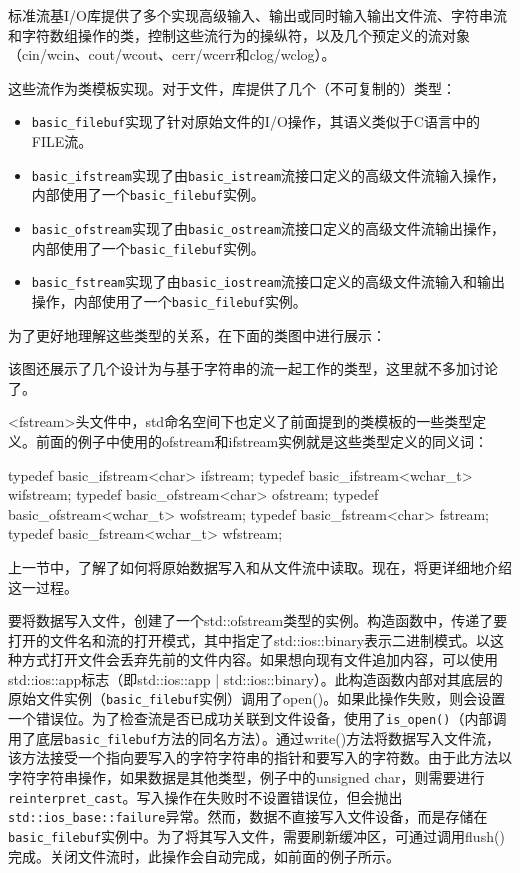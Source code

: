 
标准流基I/O库提供了多个实现高级输入、输出或同时输入输出文件流、字符串流和字符数组操作的类，控制这些流行为的操纵符，以及几个预定义的流对象（cin/wcin、cout/wcout、cerr/wcerr和clog/wclog）。

这些流作为类模板实现。对于文件，库提供了几个（不可复制的）类型：

\begin{itemize}
\item
\verb|basic_filebuf|实现了针对原始文件的I/O操作，其语义类似于C语言中的FILE流。

\item
\verb|basic_ifstream|实现了由\verb|basic_istream|流接口定义的高级文件流输入操作，内部使用了一个\verb|basic_filebuf|实例。

\item
\verb|basic_ofstream|实现了由\verb|basic_ostream|流接口定义的高级文件流输出操作，内部使用了一个\verb|basic_filebuf|实例。

\item
\verb|basic_fstream|实现了由\verb|basic_iostream|流接口定义的高级文件流输入和输出操作，内部使用了一个\verb|basic_filebuf|实例。
\end{itemize}

为了更好地理解这些类型的关系，在下面的类图中进行展示：


该图还展示了几个设计为与基于字符串的流一起工作的类型，这里就不多加讨论了。

<fstream>头文件中，std命名空间下也定义了前面提到的类模板的一些类型定义。前面的例子中使用的ofstream和ifstream实例就是这些类型定义的同义词：

\begin{cpp}
typedef basic_ifstream<char>    ifstream;
typedef basic_ifstream<wchar_t> wifstream;
typedef basic_ofstream<char>    ofstream;
typedef basic_ofstream<wchar_t> wofstream;
typedef basic_fstream<char>     fstream;
typedef basic_fstream<wchar_t>  wfstream;
\end{cpp}

上一节中，了解了如何将原始数据写入和从文件流中读取。现在，将更详细地介绍这一过程。

要将数据写入文件，创建了一个std::ofstream类型的实例。构造函数中，传递了要打开的文件名和流的打开模式，其中指定了std::ios::binary表示二进制模式。以这种方式打开文件会丢弃先前的文件内容。如果想向现有文件追加内容，可以使用std::ios::app标志（即std::ios::app | std::ios::binary）。此构造函数内部对其底层的原始文件实例（\verb|basic_filebuf|实例）调用了open()。如果此操作失败，则会设置一个错误位。为了检查流是否已成功关联到文件设备，使用了\verb|is_open()|（内部调用了底层\verb|basic_filebuf|方法的同名方法）。通过write()方法将数据写入文件流，该方法接受一个指向要写入的字符字符串的指针和要写入的字符数。由于此方法以字符字符串操作，如果数据是其他类型，例子中的unsigned char，则需要进行\verb|reinterpret_cast|。写入操作在失败时不设置错误位，但会抛出\verb|std::ios_base::failure|异常。然而，数据不直接写入文件设备，而是存储在\verb|basic_filebuf|实例中。为了将其写入文件，需要刷新缓冲区，可通过调用flush()完成。关闭文件流时，此操作会自动完成，如前面的例子所示。

